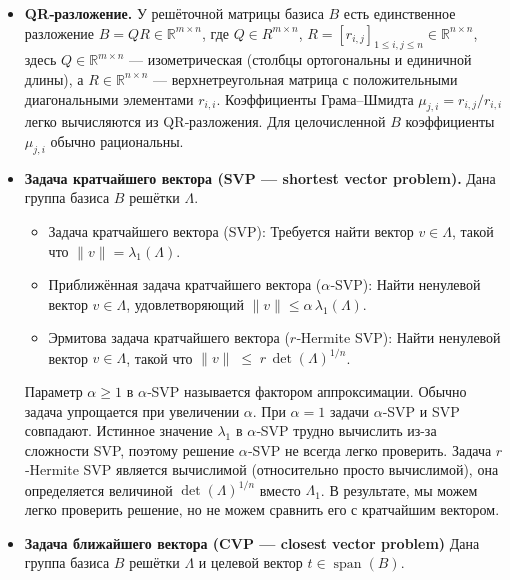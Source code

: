 \begin{itemize}
\item \textbf{QR‑разложение.} У решёточной матрицы базиса $B$ есть единственное
        разложение $B=QR\in \mathbb{R}^{m\times n}$, где $Q\in R^{m\times n}$,
        $R=[r_{i,j}]_{1\le i,j\le n} \in \mathbb{R}^{n\times n}$, здесь $Q\in
        \mathbb{R}^{m\times n}$ — изомет­рическая (столбцы ортогональны и
        единичной длины), а $R \in \mathbb{R}^{n\times n}$ — верхнетреугольная
        матрица с положительными диагональными элементами $r_{i,i}$.
        Коэффициенты Грама–Шмидта $\mu_{j,i}=r_{i,j}/r_{i,i}$ легко вычисляются
        из QR‑разложения. Для целочисленной $B$ коэффициенты $\mu_{j,i}$ обычно
        рациональны.

\item \textbf{Задача кратчайшего вектора (SVP --- shortest vector problem).}
      Дана группа базиса $B$ решётки $\Lambda$.

      \begin{itemize}
          \item Задача кратчайшего вектора (SVP): Требуется найти вектор
              $v\in\Lambda$, такой что $\lVert v\rVert=\lambda_{1}(\Lambda)$.
          \item Приближённая задача кратчайшего вектора ($\alpha$‑SVP): Найти
              ненулевой вектор $v\in\Lambda$, удовлетворяющий
              $\lVert v\rVert\le\alpha\,\lambda_{1}(\Lambda)$.
          \item Эрмитова задача кратчайшего вектора ($r$‑Hermite SVP):
              Найти ненулевой вектор $v\in\Lambda$, такой что
              $\lVert v\rVert \;\le\; r\,\det(\Lambda)^{1/n}$.
      \end{itemize}

      Параметр $\alpha\ge1$ в $\alpha$‑SVP называется фактором аппроксимации.
      Обычно задача упрощается при увеличении $\alpha$. При $\alpha=1$ задачи
      $\alpha$‑SVP и SVP совпадают. Истинное значение $\lambda_{1}$ в
      $\alpha$‑SVP трудно вычислить из-за сложности SVP, поэтому решение
      $\alpha$‑SVP не всегда легко проверить. Задача $r$‑Hermite SVP является
      вычислимой (относительно просто вычислимой), она определяется величиной
      $\det(\Lambda)^{1/n}$ вместо $\Lambda_1$. В результате, мы можем легко
      проверить решение, но не можем сравнить его с кратчайшим вектором.

\item \textbf{Задача ближайшего вектора (CVP --- closest vector problem)}
      Дана группа базиса $B$ решётки $\Lambda$ и целевой вектор
      $t\in\operatorname{span}(B)$.


\end{itemize}
